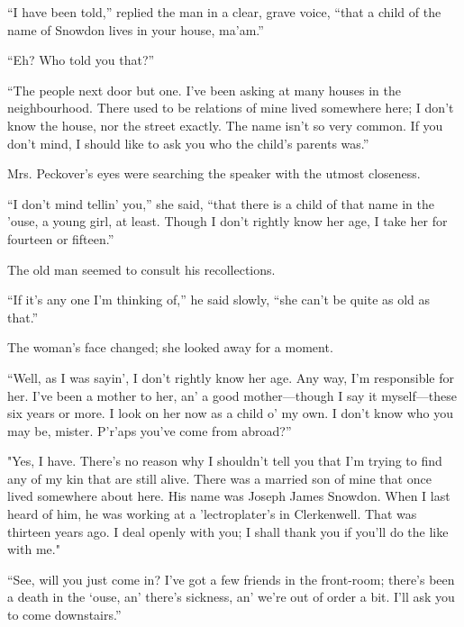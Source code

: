 ``I have been told,'' replied the man in a clear, grave voice, ``that a
child of the name of Snowdon lives in your house, ma'am.''

``Eh? Who told you that?''

``The people next door but one. I've been asking at many houses in the
neighbourhood. There used to be relations of mine lived somewhere here;
I don't know the house, nor the street exactly. The name isn't so very
common. If you don't mind, I should like to ask you who the child's
parents was.''

Mrs. Peckover's eyes were searching the speaker with the utmost
closeness.

{\protect\hypertarget{106}{}{}}``I don't mind tellin' you,'' she said,
``that there is a child of that name in the 'ouse, a young girl, at
least. Though I don't rightly know her age, I take her for fourteen or
fifteen.''

The old man seemed to consult his recollections.

``If it's any one I'm thinking of,'' he said slowly, ``she can't be
quite as old as that.''

The woman's face changed; she looked away for a moment.

``Well, as I was sayin', I don't rightly know her age. Any way, I'm
responsible for her. I've been a mother to her, an' a good
mother---though I say it myself---these six years or more. I look on her
now as a child o' my own. I don't know who you may be, mister. P'r'aps
you've come from abroad?''

"Yes, I have. There's no reason why I shouldn't tell you that I'm trying
to find any of my kin that are still alive. There was a married son of
mine that once lived somewhere about here. His name was Joseph James
Snowdon. When I last heard of him, {\protect\hypertarget{107}{}{}}he was
working at a 'lectroplater's in Clerkenwell. That was thirteen years
ago. I deal openly with you; I shall thank you if you'll do the like
with me."

``See, will you just come in? I've got a few friends in the front-room;
there's been a death in the `ouse, an' there's sickness, an' we're out
of order a bit. I'll ask you to come downstairs.''

